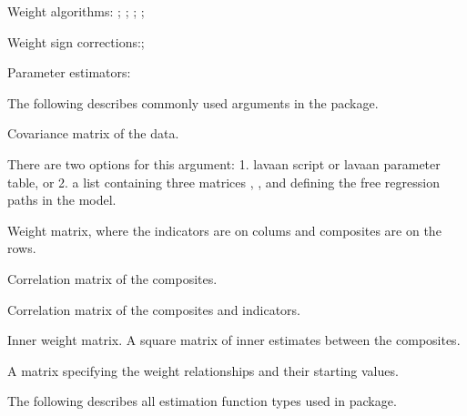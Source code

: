 \documentclass[a4paper]{book}
\begin{document}
%
\begin{SeeAlso}\relax
Weight algorithms: ; ; ; ; 

Weight sign corrections:; 

Parameter estimators: 
\end{SeeAlso}
%
\begin{Description}\relax
The following describes commonly used arguments in the  package.
\end{Description}
%
\begin{Arguments}
\begin{ldescription}
\item[\code{S}] Covariance matrix of the data.

\item[\code{model}] There are two options for this argument: 1. lavaan script or lavaan parameter
table, or 2. a list containing three matrices
, , and  defining the free regression paths
in the model.

\item[\code{W}] Weight matrix, where the indicators are on colums and composites are on the rows.

\item[\code{C}] Correlation matrix of the composites.

\item[\code{IC}] Correlation matrix of the composites and indicators.

\item[\code{E}] Inner weight matrix. A square matrix of inner estimates between the composites.

\item[\code{W.model}] A matrix specifying the weight relationships and their starting values.
\end{ldescription}
\end{Arguments}
%
\begin{Description}\relax
The following describes all estimation function types used in  package.
\end{Description}
\end{document}
